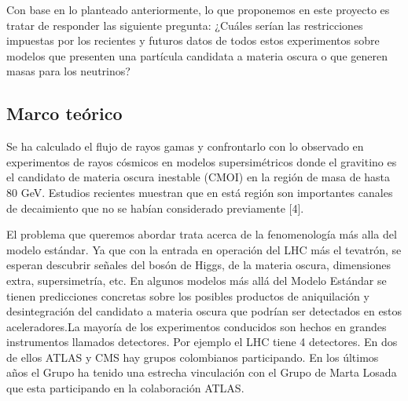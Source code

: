 Con base en lo planteado anteriormente, lo que proponemos en este proyecto es tratar de responder las siguiente pregunta: ¿Cuáles serían las restricciones impuestas por los recientes y futuros datos de todos estos experimentos sobre  modelos que presenten una partícula candidata a materia oscura o que generen masas para los neutrinos?


\subsection{Marco teórico}


\begin{ideas}
Se ha calculado el flujo de rayos gamas y confrontarlo con lo observado en experimentos de rayos cósmicos en modelos supersimétricos donde el gravitino es el candidato de materia oscura inestable (CMOI) en la región de masa de hasta 80 GeV. Estudios recientes  muestran que en está región son importantes canales de decaimiento que no se habían considerado previamente [4]. 



  El problema que queremos abordar trata acerca de la fenomenología más alla del modelo estándar.
Ya que con la entrada en operación del LHC más el tevatrón, se esperan descubrir señales del bosón de Higgs, de la materia oscura, dimensiones extra, supersimetría, etc. En algunos modelos más allá del Modelo Estándar se tienen predicciones concretas sobre los posibles productos de aniquilación y desintegración del candidato a materia oscura que podrían ser detectados en estos aceleradores.La mayoría de los experimentos conducidos son hechos en grandes instrumentos llamados detectores. Por ejemplo el LHC tiene 4 detectores. En dos de ellos ATLAS y CMS hay grupos colombianos participando. En los últimos años el Grupo ha tenido una estrecha vinculación con el Grupo de Marta Losada que esta participando en la colaboración ATLAS.


\end{ideas}
